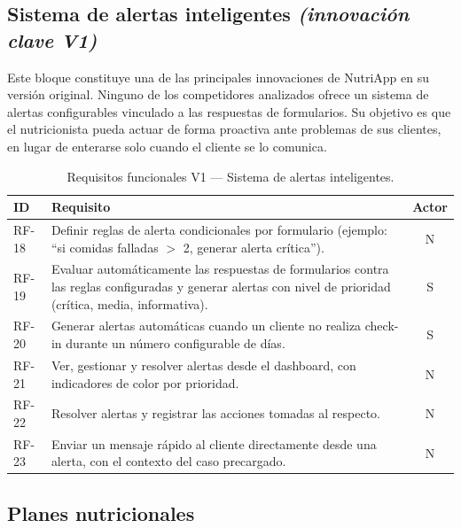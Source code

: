 \subsection{Sistema de alertas inteligentes \textnormal{\textit{(innovación clave V1)}}}

Este bloque constituye una de las principales innovaciones de NutriApp en su versión original. Ninguno de los competidores analizados ofrece un sistema de alertas configurables vinculado a las respuestas de formularios. Su objetivo es que el nutricionista pueda actuar de forma proactiva ante problemas de sus clientes, en lugar de enterarse solo cuando el cliente se lo comunica.

\begin{table}[htbp]
\centering
\small
\begin{tabular}{|l|p{10.5cm}|c|}
\hline
\textbf{ID} & \textbf{Requisito} & \textbf{Actor} \\
\hline
RF-18 & Definir reglas de alerta condicionales por formulario (ejemplo: ``si comidas falladas $>$ 2, generar alerta crítica''). & N \\
\hline
RF-19 & Evaluar automáticamente las respuestas de formularios contra las reglas configuradas y generar alertas con nivel de prioridad (crítica, media, informativa). & S \\
\hline
RF-20 & Generar alertas automáticas cuando un cliente no realiza check-in durante un número configurable de días. & S \\
\hline
RF-21 & Ver, gestionar y resolver alertas desde el dashboard, con indicadores de color por prioridad. & N \\
\hline
RF-22 & Resolver alertas y registrar las acciones tomadas al respecto. & N \\
\hline
RF-23 & Enviar un mensaje rápido al cliente directamente desde una alerta, con el contexto del caso precargado. & N \\
\hline
\end{tabular}
\caption{Requisitos funcionales V1 --- Sistema de alertas inteligentes.}
\label{tab:rf-alertas-v1}
\end{table}

\subsection{Planes nutricionales}

